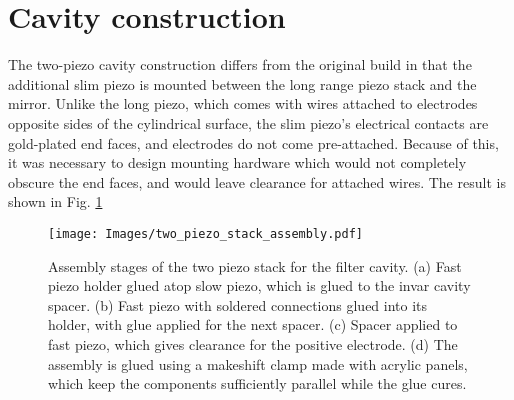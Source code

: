 \section{Cavity construction}

The two-piezo cavity construction differs from the original build in that the additional slim piezo is mounted between the long range piezo stack and the mirror. Unlike the long piezo, which comes with wires attached to electrodes opposite sides of the cylindrical surface, the slim piezo's electrical contacts are gold-plated end faces, and electrodes do not come pre-attached. Because of this, it was necessary to design mounting hardware which would not completely obscure the end faces, and would leave clearance for attached wires. The result is shown in Fig. \ref{fig:cavity_fig1}

\begin{figure}[!ht]
    \centering
    \texttt{[image: Images/two\_piezo\_stack\_assembly.pdf]}
    \caption{Assembly stages of the two piezo stack for the filter cavity. (a) Fast piezo holder glued atop slow piezo, which is glued to the invar cavity spacer. (b) Fast piezo with soldered connections glued into its holder, with glue applied for the next spacer. (c) Spacer applied to fast piezo, which gives clearance for the positive electrode. (d) The assembly is glued using a makeshift clamp made with acrylic panels, which keep the components sufficiently parallel while the glue cures.}
    \label{fig:cavity_fig1}
\end{figure}